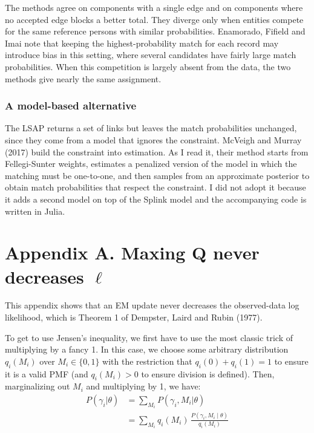 \documentclass[11pt]{article}
\begin{document}
The methods agree on components with a single edge and on components where no accepted edge blocks a better total. They diverge only when entities compete for the same reference persons with similar probabilities. Enamorado, Fifield and Imai note that keeping the highest-probability match for each record may introduce bias in this setting, where several candidates have fairly large match probabilities. When this competition is largely absent from the data, the two methods give nearly the same assignment.

\subsubsection*{A model-based alternative}

The LSAP returns a set of links but leaves the match probabilities unchanged, since they come from a model that ignores the constraint. McVeigh and Murray (2017) build the constraint into estimation. As I read it, their method starts from Fellegi-Sunter weights, estimates a penalized version of the model in which the matching must be one-to-one, and then samples from an approximate posterior to obtain match probabilities that respect the constraint. I did not adopt it because it adds a second model on top of the Splink model and the accompanying code is written in Julia.

\section*{Appendix A. Maxing Q never decreases \texorpdfstring{$\ell$}{ℓ}}

This appendix shows that an EM update never decreases the observed-data log likelihood, which is Theorem 1 of Dempster, Laird and Rubin (1977).

To get to use Jensen's inequality, we first have to use the most classic trick of multiplying by a fancy 1. In this case, we choose some arbitrary distribution $q_i(M_i)$ over $M_i \in \{0, 1\}$ with the restriction that $q_i(0) + q_i(1) = 1$ to ensure it is a valid PMF (and $q_i(M_i) > 0$ to ensure division is defined). Then, marginalizing out $M_i$ and multiplying by 1, we have:
\[
\begin{aligned}
P(\gamma_i | \theta) &= \sum _{M_i} P(\gamma_i, M_i |\theta) \\
&= \sum_{M_i} q_i(M_i)\,\frac{P(\gamma_i, M_i \mid \theta)}{q_i(M_i)}
\end{aligned}
\]
\end{document}
